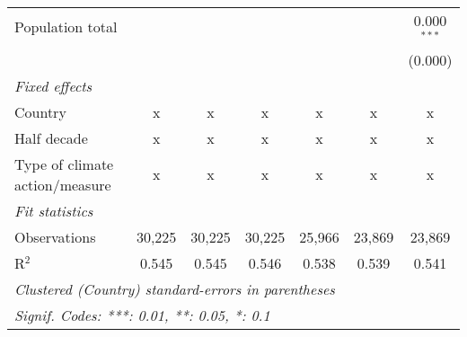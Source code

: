\begin{tabular}{lcccccc}
   Population total                                                  &             &             &              &              &              & 0.000$^{***}$\\   
                                                                     &             &             &              &              &              & (0.000)\\   
   \emph{Fixed effects}\\
   Country                                                           & x           & x           & x            & x            & x            & x\\  
   Half decade                                                       & x           & x           & x            & x            & x            & x\\  
   Type of climate action/measure                                    & x           & x           & x            & x            & x            & x\\  
   \midrule \emph{Fit statistics}\\
   Observations                                                      & 30,225      & 30,225      & 30,225       & 25,966       & 23,869       & 23,869\\  
   R$^2$                                                             & 0.545       & 0.545       & 0.546        & 0.538        & 0.539        & 0.541\\  
   \midrule
   \multicolumn{7}{l}{\emph{Clustered (Country) standard-errors in parentheses}}\\
   \multicolumn{7}{l}{\emph{Signif. Codes: ***: 0.01, **: 0.05, *: 0.1}}\\
\end{tabular}
\par\endgroup


